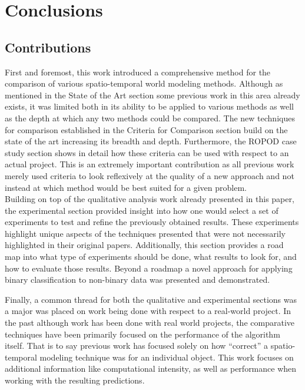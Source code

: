 

    \chapter{Conclusions}

    \section{Contributions}

    First and foremost, this work introduced a comprehensive method for the
    comparison of various spatio-temporal world modeling methods. Although as
    mentioned in the State of the Art section some previous work in this area
    already exists, it was limited both in its ability to be applied to various
    methods as well as the depth at which any two methods could be compared. The
    new techniques for comparison established in the Criteria for Comparison
    section build on the state of the art increasing its breadth and depth.
    Furthermore, the ROPOD case study section shows in detail how these criteria
    can be used with respect to an actual project. This is an extremely important
    contribution as all previous work merely used criteria to look reflexively
    at the quality of a new approach and not instead at which method would be
    best suited for a given problem. \\

    Building on top of the qualitative analysis work already presented in this
    paper, the experimental section provided insight into how one would select
    a set of experiments to test and refine the previously obtained results.
    These experiments highlight unique aspects of the techniques presented that
    were not necessarily highlighted in their original papers.
    Additionally, this section provides a road map into what type of experiments
    should be done, what results to look for, and how to evaluate those results.
    Beyond a roadmap a novel approach for applying binary classification to
    non-binary data was presented and demonstrated.

    Finally, a common thread for both the qualitative and experimental
    sections was a major was placed on work being done with respect to a
    real-world project. In the past although work has been done with real
    world projects, the comparative techniques have been primarily focused on
    the performance of the algorithm itself. That is to say previous work has
    focused solely on how ``correct'' a spatio-temporal modeling technique was
    for an individual object. This work focuses on additional information like
    computational intensity, as well as performance when working with the
    resulting predictions. \\

